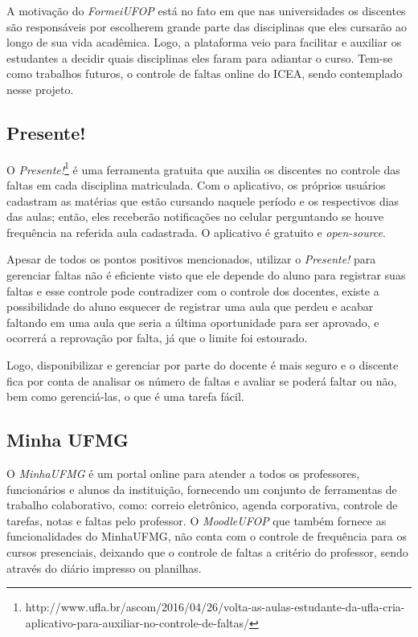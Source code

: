 \documentclass[
  12pt,       %
  openright,      %
  oneside,      %
  a4paper,      %
  english,      %
  french,        %
  spanish,     %
  brazil        %
  ]{abntex2-decsi}
\begin{document}
        A motivação do \textit{FormeiUFOP} está no fato em que nas universidades os discentes são responsáveis por escolherem grande parte das disciplinas que eles cursarão ao longo de sua vida acadêmica. Logo, a plataforma veio para facilitar e auxiliar os estudantes a decidir quais disciplinas eles faram para adiantar o curso. Tem-se como trabalhos futuros, o controle de faltas online do ICEA, sendo contemplado nesse projeto.

        \subsection{Presente!}
         O \textit{Presente!}\footnote{http://www.ufla.br/ascom/2016/04/26/volta-as-aulas-estudante-da-ufla-cria-aplicativo-para-auxiliar-no-controle-de-faltas/} é uma ferramenta gratuita que auxilia os discentes no controle das faltas em cada disciplina matriculada. Com o aplicativo, os próprios usuários cadastram as matérias que estão cursando naquele período e os respectivos dias das aulas; então, eles receberão notificações no celular perguntando se houve frequência na referida aula cadastrada. O aplicativo é gratuito e \textit{open-source}.

        Apesar de todos os pontos positivos mencionados, utilizar o \textit{Presente!} para gerenciar faltas não é eficiente visto que ele depende do aluno para registrar suas faltas e esse controle pode contradizer com o controle dos docentes, existe a possibilidade do aluno esquecer de registrar uma aula que perdeu e acabar faltando em uma aula que seria a última oportunidade para ser aprovado, e ocorrerá a reprovação por falta, já que o limite foi estourado. 
        
        Logo, disponibilizar e gerenciar por parte do docente é mais seguro e o discente fica por conta de analisar os número de faltas e avaliar se poderá faltar ou não, bem como gerenciá-las, o que é uma tarefa fácil.

        \subsection{Minha UFMG}
        
		O \textit{MinhaUFMG} é um portal online para atender a todos os professores, funcionários e alunos da instituição, fornecendo um conjunto de ferramentas de trabalho colaborativo, como: correio eletrônico, agenda corporativa, controle de tarefas, notas e faltas pelo professor. O \textit{MoodleUFOP} que também fornece as funcionalidades do MinhaUFMG, não conta com o controle de frequência para os cursos presenciais, deixando que o controle de faltas a critério do professor, sendo através do diário impresso ou planilhas.
        
\end{document}
